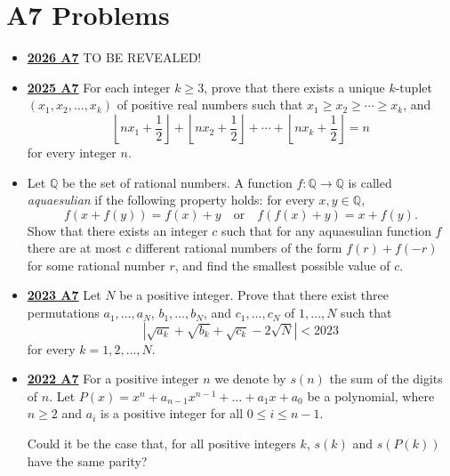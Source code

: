 \documentclass[11pt]{scrartcl}
\begin{document}
\section*{A7 Problems}  \label{A7}
 \begin{itemize}[leftmargin=*]

 \item \href{https://www.imo-official.org/assets/documents/problems/2026/IMO2026SL.pdf}{\textbf{2026 A7}} TO BE REVEALED!
 
 \item \href{https://artofproblemsolving.com/community/c6h3866874p38676992}{\textbf{2025 A7}}  For each integer $k\geqslant 3$, prove that there exists a unique $k$-tuplet$(x_1,x_2,\dots,x_k)$ of positive real numbers such that $x_1\geqslant x_2\geqslant\cdots \geqslant x_k$, and$$\left\lfloor nx_1+\frac{1}{2}\right\rfloor+\left\lfloor nx_2+\frac{1}{2}\right\rfloor+\cdots+\left\lfloor nx_k+\frac{1}{2}\right\rfloor=n$$for every integer $n$.

\item {} Let $\mathbb{Q}$ be the set of rational numbers. A function $f: \mathbb{Q} \to \mathbb{Q}$ is called \textit{aquaesulian} if the following property holds: for every $x,y \in \mathbb{Q}$,
\[ f(x+f(y)) = f(x) + y \quad \text{or} \quad f(f(x)+y) = x + f(y). \]Show that there exists an integer $c$ such that for any aquaesulian function $f$ there are at most $c$ different rational numbers of the form $f(r) + f(-r)$ for some rational number $r$, and find the smallest possible value of $c$.
\item \href{https://artofproblemsolving.com/community/c6h3359726p31218377}{\textbf{2023 A7}} Let $N$ be a positive integer. Prove that there exist three permutations $a_1,\dots,a_N$, $b_1,\dots,b_N$, and $c_1,\dots,c_N$ of $1,\dots,N$ such that\[\left|\sqrt{a_k}+\sqrt{b_k}+\sqrt{c_k}-2\sqrt{N}\right|<2023\]for every $k=1,2,\dots,N$.

    \item \href{https://artofproblemsolving.com/community/c6h3107335p28104281}{\textbf{2022 A7}} 	For a positive integer $n$ we denote by $s(n)$ the sum of the digits of $n$. Let $P(x)=x^n+a_{n-1}x^{n-1}+\dots+a_1x+a_0$ be a polynomial, where $n \geqslant  2$ and $a_i$ is a positive integer for all $0 \leqslant i \leqslant n-1$. 
    
    Could it be the case that, for all positive integers $k$, $s(k)$ and $s(P(k))$ have the same parity?
    

\end{itemize}
\end{document}
